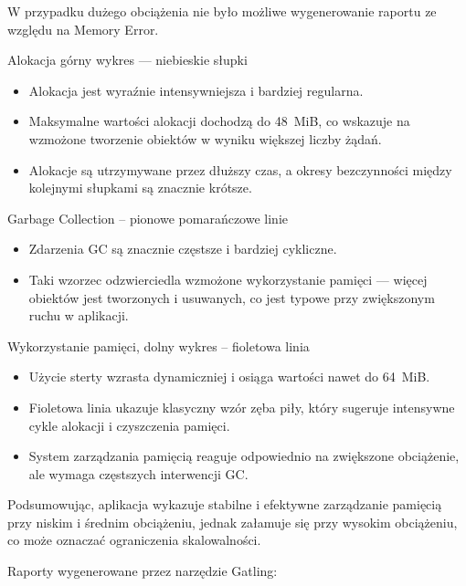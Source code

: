\documentclass[runningheads,12pt]{llncs}
\begin{document}
W przypadku dużego obciążenia nie było możliwe wygenerowanie raportu ze względu na Memory Error.

Alokacja górny wykres — niebieskie słupki

\begin{itemize}
  \item Alokacja jest wyraźnie intensywniejsza i bardziej regularna.
  \item Maksymalne wartości alokacji dochodzą do 48~MiB, co wskazuje na wzmożone tworzenie obiektów w wyniku większej liczby żądań.
  \item Alokacje są utrzymywane przez dłuższy czas, a okresy bezczynności między kolejnymi słupkami są znacznie krótsze.
\end{itemize}

Garbage Collection – pionowe pomarańczowe linie

\begin{itemize}
  \item Zdarzenia GC są znacznie częstsze i bardziej cykliczne.
  \item Taki wzorzec odzwierciedla wzmożone wykorzystanie pamięci — więcej obiektów jest tworzonych i usuwanych, co jest typowe przy zwiększonym ruchu w aplikacji.
\end{itemize}

Wykorzystanie pamięci, dolny wykres – fioletowa linia

\begin{itemize}
  \item Użycie sterty wzrasta dynamiczniej i osiąga wartości nawet do 64~MiB.
  \item Fioletowa linia ukazuje klasyczny wzór zęba piły, który sugeruje intensywne cykle alokacji i czyszczenia pamięci.
  \item System zarządzania pamięcią reaguje odpowiednio na zwiększone obciążenie, ale wymaga częstszych interwencji GC.
\end{itemize}

Podsumowując, aplikacja wykazuje stabilne i efektywne zarządzanie pamięcią przy niskim i średnim obciążeniu, jednak załamuje się przy wysokim obciążeniu, co może oznaczać ograniczenia skalowalności.

\newpage

Raporty wygenerowane przez narzędzie Gatling:

\end{document}
